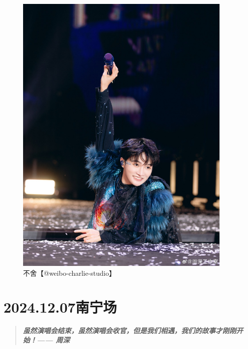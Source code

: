 \documentclass[]{ctexbook}
\begin{document}
\begin{figure}

{\centering \includegraphics[width=300pt]{img/nanning20241206/006} 

}

\caption{不舍【@weibo-charlie-studio】}\label{fig:unnamed-chunk-160}
\end{figure}

\chapter{2024.12.07南宁场}\label{nanning-20241207}

\begin{quote}
\textbf{\emph{虽然演唱会结束，虽然演唱会收官，但是我们相遇，我们的故事才刚刚开始！------ 周深}}
\end{quote}
\end{document}
